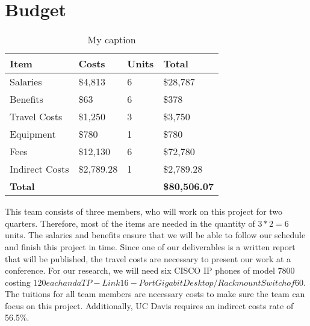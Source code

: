 \section{Budget}

\begin{table}[]
\centering
\caption{My caption}
\label{my-label}
\begin{tabular}{|l|l|l|l|}
\hline
\textbf{Item}  & \textbf{Costs} & \textbf{Units} & \textbf{Total}        \\ \hline
Salaries       & \$4,813        & 6              & \$28,787              \\ \hline
Benefits       & \$63           & 6              & \$378                 \\ \hline
Travel Costs   & \$1,250        & 3              & \$3,750               \\ \hline
Equipment      & \$780          & 1              & \$780                 \\ \hline
Fees           & \$12,130       & 6              & \$72,780              \\ \hline
Indirect Costs & \$2,789.28     & 1              & \$2,789.28           \\ \hline
\textbf{Total} &                &                & \textbf{\$80,506.07} \\ \hline
\end{tabular}
\end{table}

This team consists of three members, who will work on this project for two quarters. Therefore, most of the items are needed in the quantity of $3*2=6$ units. The salaries and benefits ensure that we will be able to follow our schedule and finish this project in time. Since one of our deliverables is a written report that will be published, the travel costs are necessary to present our work at a conference. For our research, we will need six CISCO IP phones of model 7800 costing $120 each and a TP-Link 16-Port Gigabit Desktop/Rackmount Switch of $60. The tuitions for all team members are necessary costs to make sure the team can focus on this project. Additionally, UC Davis requires an indirect costs rate of 56.5\%.